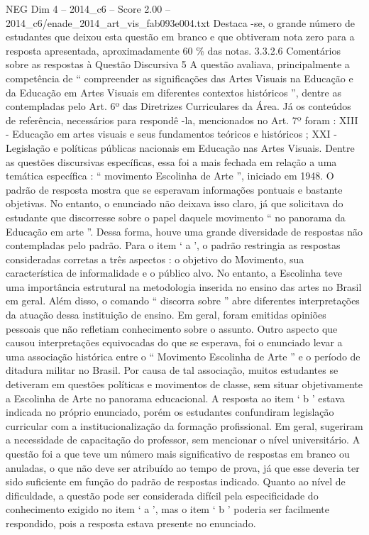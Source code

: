 \begin{textsample}{NEG Dim 4 – 2014\_c6 – Score 2.00 – 2014\_c6/enade\_2014\_art\_vis\_fab093e004.txt}
Destaca -se, o grande número de estudantes que deixou esta questão em branco e que obtiveram nota zero para a resposta apresentada, aproximadamente 60 \% das notas. 3.3.2.6 Comentários sobre as respostas à Questão Discursiva 5 A questão avaliava, principalmente a competência de “ compreender as significações das Artes Visuais na Educação e da Educação em Artes Visuais em diferentes contextos históricos ”, dentre as contempladas pelo Art. 6º das Diretrizes Curriculares da Área.
Já os conteúdos de referência, necessários para respondê -la, mencionados no Art. 7º foram : XIII - Educação em artes visuais e seus fundamentos teóricos e históricos ; XXI - Legislação e políticas públicas nacionais em Educação nas Artes Visuais.
Dentre as questões discursivas específicas, essa foi a mais fechada em relação a uma temática específica : “ movimento Escolinha de Arte ”, iniciado em 1948.
O padrão de resposta mostra que se esperavam informações pontuais e bastante objetivas.
No entanto, o enunciado não deixava isso claro, já que solicitava do estudante que discorresse sobre o papel daquele movimento “ no panorama da Educação em arte ”.
Dessa forma, houve uma grande diversidade de respostas não contempladas pelo padrão.
Para o item ‘ a ’, o padrão restringia as respostas consideradas corretas a três aspectos : o objetivo do Movimento, sua característica de informalidade e o público alvo.
No entanto, a Escolinha teve uma importância estrutural na metodologia inserida no ensino das artes no Brasil em geral.
Além disso, o comando “ discorra sobre ” abre diferentes interpretações da atuação dessa instituição de ensino.
Em geral, foram emitidas opiniões pessoais que não refletiam conhecimento sobre o assunto.
Outro aspecto que causou interpretações equivocadas do que se esperava, foi o enunciado levar a uma associação histórica entre o “ Movimento Escolinha de Arte ” e o período de ditadura militar no Brasil.
Por causa de tal associação, muitos estudantes se detiveram em questões políticas e movimentos de classe, sem situar objetivamente a Escolinha de Arte no panorama educacional.
A resposta ao item ‘ b ’ estava indicada no próprio enunciado, porém os estudantes confundiram legislação curricular com a institucionalização da formação profissional.
Em geral, sugeriram a necessidade de capacitação do professor, sem mencionar o nível universitário.
A questão foi a que teve um número mais significativo de respostas em branco ou anuladas, o que não deve ser atribuído ao tempo de prova, já que esse deveria ter sido suficiente em função do padrão de respostas indicado.
Quanto ao nível de dificuldade, a questão pode ser considerada difícil pela especificidade do conhecimento exigido no item ‘ a ’, mas o item ‘ b ’ poderia ser facilmente respondido, pois a resposta estava presente no enunciado.

\end{textsample}
